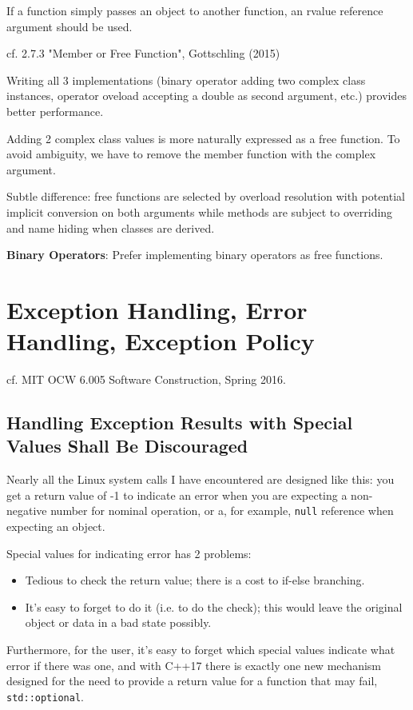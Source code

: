 \documentclass[10pt]{amsart}
\begin{document}
\begin{multicols*}{2}
If a function simply passes an object to another function, an rvalue reference argument  should be used.

cf. 2.7.3 "Member or Free Function", Gottschling (2015) \cite{Gott2015}

Writing all 3 implementations (binary operator adding two complex class instances, operator oveload accepting a double as second argument, etc.) provides better performance.

Adding 2 complex class values is more naturally expressed as a free function. To avoid ambiguity, we have to remove the member function with the complex argument.

Subtle difference: free functions are selected by overload resolution with potential implicit conversion on both arguments while methods are subject to overriding and name hiding when classes are derived.

\textbf{Binary Operators}: Prefer implementing binary operators as free functions.




\section{Exception Handling, Error Handling, Exception Policy}

cf. MIT OCW 6.005 Software Construction, Spring 2016.

\subsection{Handling Exception Results with Special Values Shall Be Discouraged}

Nearly all the Linux system calls I have encountered are designed like this: you get a return value of -1 to indicate an error when you are expecting a non-negative number for nominal operation, or a, for example, \verb|null| reference when expecting an object. 

Special values for indicating error has 2 problems:
\begin{itemize}
	\item Tedious to check the return value; there is a cost to if-else branching.
	\item It's easy to forget to do it (i.e. to do the check); this would leave the original object or data in a bad state possibly.
\end{itemize}
Furthermore, for the user, it's easy to forget which special values indicate what error if there was one, and with C++17 there is exactly one new mechanism designed for the need to provide a return value for a function that may fail, \verb|std::optional|.



\end{multicols*}
\end{document}
